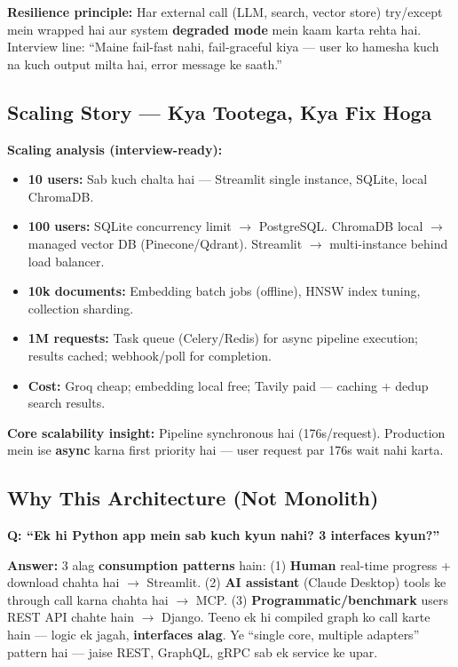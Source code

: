 \begin{warningbox}
\textbf{Resilience principle:} Har external call (LLM, search, vector store) try/except mein wrapped hai aur system \textbf{degraded mode} mein kaam karta rehta hai. Interview line: ``Maine fail-fast nahi, fail-graceful kiya --- user ko hamesha kuch na kuch output milta hai, error message ke saath.''
\end{warningbox}

\subsection{Scaling Story --- Kya Tootega, Kya Fix Hoga}

\begin{conceptbox}
\textbf{Scaling analysis (interview-ready):}

\begin{itemize}
\item \textbf{10 users:} Sab kuch chalta hai --- Streamlit single instance, SQLite, local ChromaDB.
\item \textbf{100 users:} SQLite concurrency limit $\rightarrow$ PostgreSQL. ChromaDB local $\rightarrow$ managed vector DB (Pinecone/Qdrant). Streamlit $\rightarrow$ multi-instance behind load balancer.
\item \textbf{10k documents:} Embedding batch jobs (offline), HNSW index tuning, collection sharding.
\item \textbf{1M requests:} Task queue (Celery/Redis) for async pipeline execution; results cached; webhook/poll for completion.
\item \textbf{Cost:} Groq cheap; embedding local free; Tavily paid --- caching + dedup search results.
\end{itemize}

\textbf{Core scalability insight:} Pipeline synchronous hai (176s/request). Production mein ise \textbf{async} karna first priority hai --- user request par 176s wait nahi karta.
\end{conceptbox}

\subsection{Why This Architecture (Not Monolith)}

\begin{interviewbox}
\textbf{Q: ``Ek hi Python app mein sab kuch kyun nahi? 3 interfaces kyun?''}

\textbf{Answer:} 3 alag \textbf{consumption patterns} hain: (1) \textbf{Human} real-time progress + download chahta hai $\rightarrow$ Streamlit. (2) \textbf{AI assistant} (Claude Desktop) tools ke through call karna chahta hai $\rightarrow$ MCP. (3) \textbf{Programmatic/benchmark} users REST API chahte hain $\rightarrow$ Django. Teeno ek hi compiled graph ko call karte hain --- logic ek jagah, \textbf{interfaces alag}. Ye ``single core, multiple adapters'' pattern hai --- jaise REST, GraphQL, gRPC sab ek service ke upar.
\end{interviewbox}
